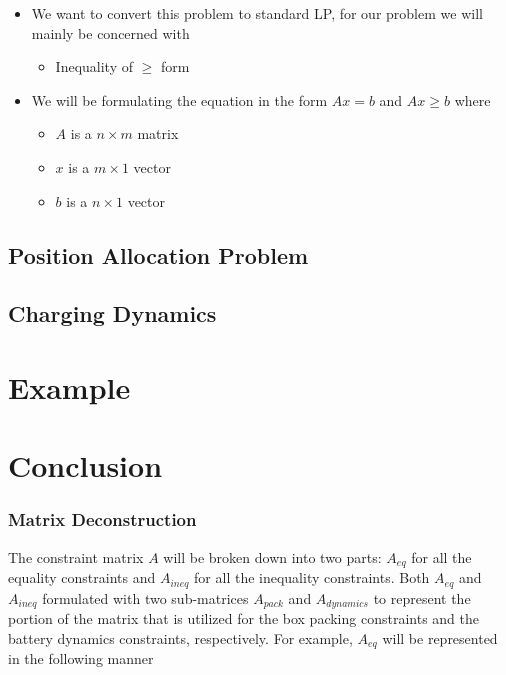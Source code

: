 \documentclass[letterpaper, 10pt, conference]{IEEEtran}
\begin{document}
\begin{itemize}
\item
  We want to convert this problem to standard LP, for our problem we
  will mainly be concerned with

  \begin{itemize}
  \item
    Inequality of \(\geq\) form
  \end{itemize}
\item
  We will be formulating the equation in the form \(Ax = b\) and
  \(Ax \geq b\) where

  \begin{itemize}
  \item
    \(A\) is a \(n \times m\) matrix
  \item
    \(x\) is a \(m \times 1\) vector
  \item
    \(b\) is a \(n \times 1\) vector
  \end{itemize}
\end{itemize}


\subsection{Position Allocation Problem}
\subsection{Charging Dynamics}

\section{Example}

\section{Conclusion}

\subsubsection{Matrix Deconstruction}\label{matrix-deconstruction}

The constraint matrix \(A\) will be broken down into two parts:
\(A_{eq}\) for all the equality constraints and \(A_{ineq}\) for all the
inequality constraints. Both \(A_{eq}\) and \(A_{ineq}\) formulated with
two sub-matrices \(A_{pack}\) and \(A_{dynamics}\) to represent the
portion of the matrix that is utilized for the box packing constraints
and the battery dynamics constraints, respectively. For example,
\(A_{eq}\) will be represented in the following manner
\end{document}

